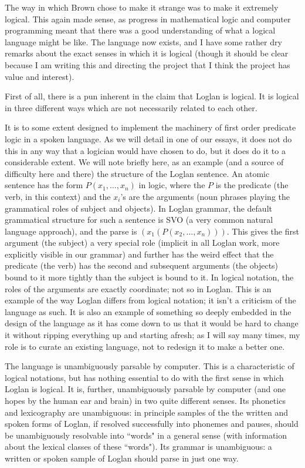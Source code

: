 \documentclass[12pt]{article}
\begin{document}
The way in which Brown chose to make it strange was to make it extremely logical.  This again made sense, as progress in mathematical logic and computer programming meant that there was a good understanding of what a logical language might be like.  The language now exists, and I have some rather dry remarks about the exact senses in which it is logical (though it should be clear because I am writing this and directing the project that I think the project has value and interest).

First of all, there is a pun inherent in the claim that Loglan is logical.  It is logical in three different ways which are not necessarily related to each other.

It is to some extent designed to implement the machinery of first order predicate logic in a spoken language.  As we will detail in one of our essays, it does not do this in any way that a logician would have chosen to do, but it does do it to a considerable extent.  We will note briefly here, as an example (and a source of difficulty here and there) the structure of the Loglan sentence.  An atomic sentence has the form $P(x_1,\ldots,x_n)$ in logic, where the $P$ is the predicate (the verb, in this context) and the $x_i$'s are the arguments (noun phrases playing the grammatical roles of subject and objects).  In Loglan grammar, the default grammatical structure for such a sentence is SVO (a very common natural language approach), and the parse is $(x_1(P(x_2,\ldots,x_n)))$.  This gives the first argument (the subject) a very special role
(implicit in all Loglan work, more explicitly visible in our grammar) and further has the weird effect that the predicate (the verb) has the second and subsequent arguments (the objects) bound to it more tightly than the subject is bound to it.  In logical notation, the roles of the arguments are exactly coordinate;  not so in Loglan.  This is an example of the way Loglan differs from logical notation;  it isn't a criticism of the language as such.  It is also an example of something so deeply embedded in the design of the language as it has come down to us that it would be hard to change it without ripping everything up and starting afresh;  as I will say many times, my role is to curate an existing language, not to redesign it to make a better one.

The language is unambiguously parsable by computer.  This is a characteristic of logical notations, but has nothing essential to do with the first sense in which Loglan is logical.  It is, further, unambiguously parsable by computer (and one hopes by the human ear and brain) in two quite different senses.  Its phonetics and lexicography are unambiguous:  in principle samples of the the written and spoken forms of Loglan, if resolved successfully into phonemes and pauses,  should be unambiguously resolvable into ``words" in a general sense (with information about the lexical classes of these ``words").  Its grammar is unambiguous:  a written or spoken sample of Loglan should parse in just one way.
\end{document}
